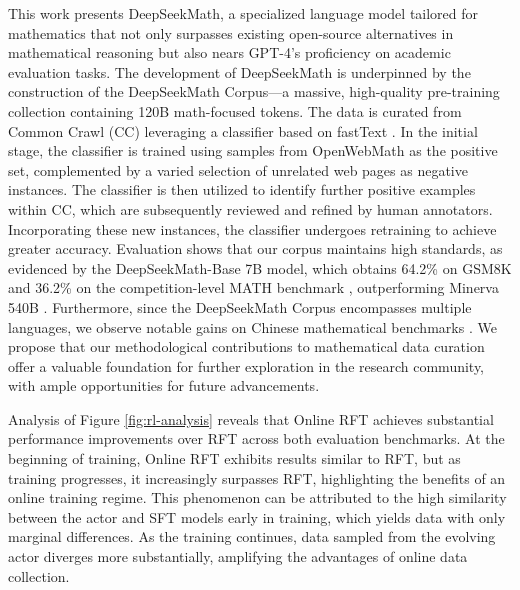 \begin{itemize}[topsep=0pt]
This work presents DeepSeekMath, a specialized language model tailored for mathematics that not only surpasses existing open-source alternatives in mathematical reasoning but also nears GPT-4's proficiency on academic evaluation tasks. The development of DeepSeekMath is underpinned by the construction of the DeepSeekMath Corpus—a massive, high-quality pre-training collection containing 120B math-focused tokens. The data is curated from Common Crawl (CC) leveraging a classifier based on fastText \citep{joulin2016fasttext}. In the initial stage, the classifier is trained using samples from OpenWebMath \citep{openwebmath} as the positive set, complemented by a varied selection of unrelated web pages as negative instances. The classifier is then utilized to identify further positive examples within CC, which are subsequently reviewed and refined by human annotators. Incorporating these new instances, the classifier undergoes retraining to achieve greater accuracy. Evaluation shows that our corpus maintains high standards, as evidenced by the DeepSeekMath-Base 7B model, which obtains 64.2\% on GSM8K \citep{gsm8k} and 36.2\% on the competition-level MATH benchmark \citep{MATH}, outperforming Minerva 540B \citep{minerva}. Furthermore, since the DeepSeekMath Corpus encompasses multiple languages, we observe notable gains on Chinese mathematical benchmarks \citep{wei2023cmath,agieval}. We propose that our methodological contributions to mathematical data curation offer a valuable foundation for further exploration in the research community, with ample opportunities for future advancements.

Analysis of Figure \ref{fig:rl-analysis} reveals that Online RFT achieves substantial performance improvements over RFT across both evaluation benchmarks. At the beginning of training, Online RFT exhibits results similar to RFT, but as training progresses, it increasingly surpasses RFT, highlighting the benefits of an online training regime. This phenomenon can be attributed to the high similarity between the actor and SFT models early in training, which yields data with only marginal differences. As the training continues, data sampled from the evolving actor diverges more substantially, amplifying the advantages of online data collection.


\end{itemize}
